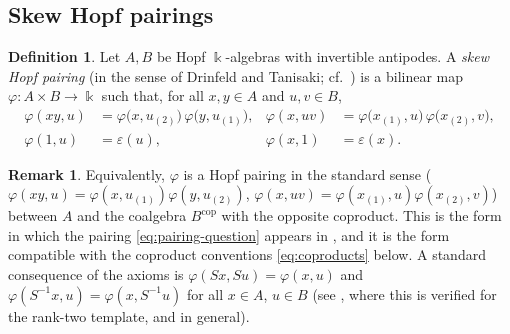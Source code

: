\documentclass[11pt]{amsart}
\theoremstyle{definition}
\newtheorem{definition}[theorem]{Definition}
\newtheorem{remark}[theorem]{Remark}
\newcommand{\BK}{\Bbbk}
\begin{document}
\subsection{Skew Hopf pairings}
\begin{definition}\label{def:skew}
Let $A,B$ be Hopf $\BK$-algebras with invertible antipodes. A \emph{skew Hopf
pairing} (in the sense of Drinfeld and Tanisaki; cf.\ \cite{Dr,Tan,UvA}) is a
bilinear map $\varphi:A\times B\to\BK$ such that, for all $x,y\in A$ and
$u,v\in B$,
\begin{align*}
\varphi(xy,u)&=\varphi\big(x,u_{(2)}\big)\,\varphi\big(y,u_{(1)}\big), &
\varphi(x,uv)&=\varphi\big(x_{(1)},u\big)\,\varphi\big(x_{(2)},v\big),\\
\varphi(1,u)&=\varepsilon(u), & \varphi(x,1)&=\varepsilon(x).
\end{align*}
\end{definition}

\begin{remark}
Equivalently, $\varphi$ is a Hopf pairing in the standard sense
($\varphi(xy,u)=\varphi(x,u_{(1)})\varphi(y,u_{(2)})$,
$\varphi(x,uv)=\varphi(x_{(1)},u)\varphi(x_{(2)},v)$) between $A$ and the
coalgebra $B^{\mathrm{cop}}$ with the opposite coproduct. This is the form in
which the pairing \eqref{eq:pairing-question} appears in \cite{KS,UvA}, and it is
the form compatible with the coproduct conventions \eqref{eq:coproducts} below.
A standard consequence of the axioms is $\varphi(Sx,Su)=\varphi(x,u)$ and
$\varphi(S^{-1}x,u)=\varphi(x,S^{-1}u)$ for all $x\in A$, $u\in B$
(see \cite{UvA}, where this is verified for the rank-two template, and
\cite{Maj,Kas} in general).
\end{remark}
\end{document}
